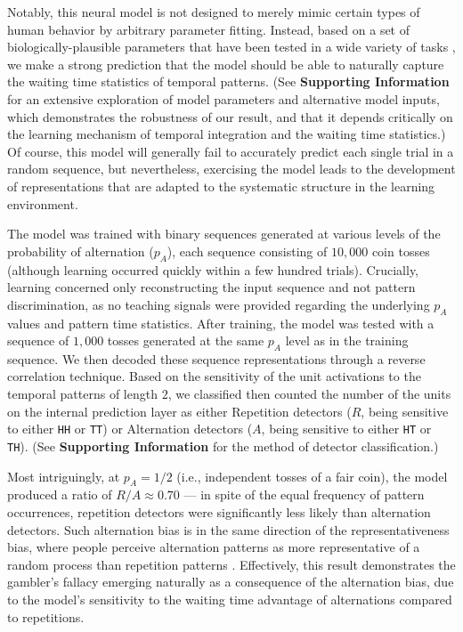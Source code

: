 \documentclass{pnastwo}
\begin{document}
\begin{article}
Notably, this neural model is not designed to merely mimic certain types of human behavior by arbitrary parameter fitting.
Instead, based on a set of biologically-plausible parameters that have been tested in a wide variety of tasks \cite{OReilly2012wiki,OReilly2014TI}, we make a strong prediction that the model should be able to naturally capture the waiting time statistics of temporal patterns.
(See \textbf{Supporting Information} for an extensive exploration of model parameters and alternative model inputs, which demonstrates the robustness of our result, and that it depends critically on the learning mechanism of temporal integration and the waiting time statistics.)
Of course, this model will generally fail to accurately predict each single trial in a random sequence, but nevertheless, exercising the model leads to the development of representations that are adapted to the systematic structure in the learning environment.


The model was trained with binary sequences generated at various levels of the probability of alternation ($p_A$),
each sequence consisting of $10,\!000$ coin tosses (although learning occurred quickly within a few hundred trials).
Crucially, learning concerned only reconstructing the input sequence and not pattern discrimination, as no teaching signals were provided regarding the underlying $p_A$ values and pattern time statistics.
After training, the model was tested with a sequence of $1,\!000$ tosses generated at the same $p_A$ level as in the training sequence.
We then decoded these sequence representations through a reverse correlation technique.
Based on the sensitivity of the unit activations to the temporal patterns of length $2$, we classified then counted the number of the units on the internal prediction layer as either Repetition detectors ($R$, being sensitive to either \texttt{HH} or \texttt{TT}) or Alternation detectors ($A$, being sensitive to either \texttt{HT} or \texttt{TH}).
(See \textbf{Supporting Information} for the method of detector classification.)

Most intriguingly, at $p_A=1/2$ (i.e., independent tosses of a fair coin), the model produced a ratio of $R/A \approx 0.70$ --- in spite of the equal frequency of pattern occurrences, repetition detectors were significantly less likely than alternation detectors.
Such alternation bias is in the same direction of the representativeness bias, where people perceive alternation patterns as more representative of a random process than repetition patterns \cite{Tversky1971,Tversky1974}.
Effectively, this result demonstrates the gambler's fallacy emerging naturally as a consequence of the alternation bias, due to the model's sensitivity to the waiting time advantage of alternations compared to repetitions.


\end{article}
\end{document}
